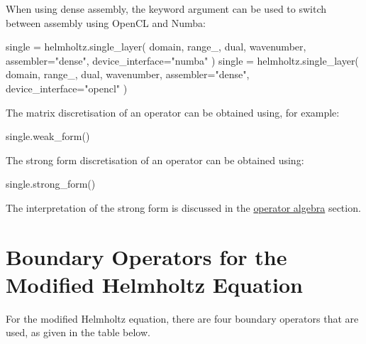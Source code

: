 \documentclass[a4paper]{book}
\begin{document}
When using dense assembly, the keyword argument  can be used to switch
between assembly using OpenCL and Numba:
\begin{python}
single = helmholtz.single_layer(
    domain, range_, dual, wavenumber, assembler="dense",
    device_interface="numba"
    )
single = helmholtz.single_layer(
    domain, range_, dual, wavenumber, assembler="dense",
    device_interface="opencl"
    )
\end{python}

The matrix discretisation of an operator can be obtained using, for example:

\begin{python}
single.weak_form()
\end{python}

The strong form discretisation of an operator can be obtained using:
\begin{python}
single.strong_form()
\end{python}
The interpretation of the strong form is discussed in the \href{operator_algebra.md}{operator algebra}
section.


\section{Boundary Operators for the Modified Helmholtz Equation}

For the modified Helmholtz equation, there are four boundary operators that are used, as given in the table
below.
\end{document}
